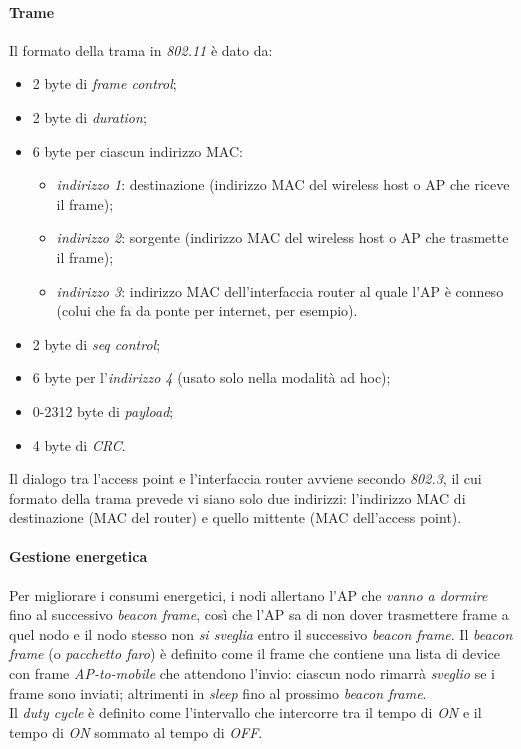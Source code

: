 \paragraph{Trame}
Il formato della trama in \textit{802.11} è dato da:
\begin{itemize}
	\item 2 byte di \textit{frame control};
	\item 2 byte di \textit{duration};
	\item 6 byte per ciascun indirizzo MAC:
	\begin{itemize}
		\item \textit{indirizzo 1}: destinazione (indirizzo MAC del wireless host o AP che riceve il frame);
		\item \textit{indirizzo 2}: sorgente (indirizzo MAC del wireless host o AP che trasmette il frame);
		\item \textit{indirizzo 3}: indirizzo MAC dell'interfaccia router al quale l'AP è conneso (colui che fa da ponte per internet, per esempio).
	\end{itemize}
	\item 2 byte di \textit{seq control};
	\item 6 byte per l'\textit{indirizzo 4} (usato solo nella modalità ad hoc);
	\item 0-2312 byte di \textit{payload};
	\item 4 byte di \textit{CRC}.
\end{itemize}
Il dialogo tra l'access point e l'interfaccia router avviene secondo \textit{802.3}, il cui formato della trama prevede vi siano solo due indirizzi: l'indirizzo MAC di destinazione (MAC del router) e quello mittente (MAC dell'access point).

\paragraph{Gestione energetica}
Per migliorare i consumi energetici, i nodi allertano l'AP che \textit{vanno a dormire} fino al successivo \textit{beacon frame}, così che l'AP sa di non dover trasmettere frame a quel nodo e il nodo stesso non \textit{si sveglia} entro il successivo \textit{beacon frame}.
Il \textit{beacon frame} (o \textit{pacchetto faro}) è definito come il frame che contiene una lista di device con frame \textit{AP-to-mobile} che attendono l'invio: ciascun nodo rimarrà \textit{sveglio} se i frame sono inviati; altrimenti in \textit{sleep} fino al prossimo \textit{beacon frame}. \\
Il \textit{duty cycle} è definito come l'intervallo che intercorre tra il tempo di \textit{ON} e il tempo di \textit{ON} sommato al tempo di \textit{OFF}.

